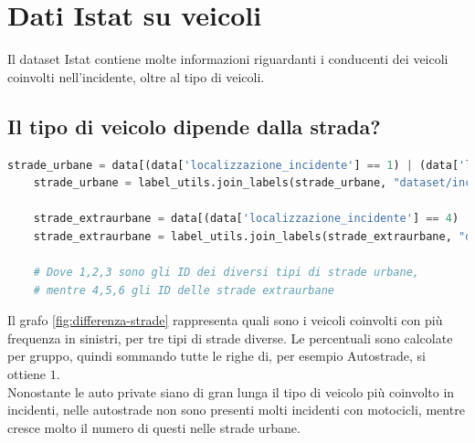 \documentclass[a4paper]{report}
\begin{document}
\section{Dati Istat su veicoli}

Il dataset Istat contiene molte informazioni riguardanti i conducenti dei veicoli coinvolti 
nell'incidente, oltre al tipo di veicoli.

\subsection{Il tipo di veicolo dipende dalla strada?}


\begin{lstlisting}[language=Python]
    strade_urbane = data[(data['localizzazione_incidente'] == 1) | (data['localizzazione_incidente'] == 2) | (data['localizzazione_incidente'] == 3)]['tipo_veicolo_a']
    strade_urbane = label_utils.join_labels(strade_urbane, "dataset/incidenti/Classificazioni/tipo_veicoli__b_.csv").value_counts(normalize=True).sort_index()

    strade_extraurbane = data[(data['localizzazione_incidente'] == 4) | (data['localizzazione_incidente'] == 5) | (data['localizzazione_incidente'] == 6)]['tipo_veicolo_a']
    strade_extraurbane = label_utils.join_labels(strade_extraurbane, "dataset/incidenti/Classificazioni/tipo_veicoli__b_.csv").value_counts(normalize=True).sort_index()

    # Dove 1,2,3 sono gli ID dei diversi tipi di strade urbane, 
    # mentre 4,5,6 gli ID delle strade extraurbane
\end{lstlisting}

Il grafo \ref{fig:differenza-strade} rappresenta quali sono i veicoli coinvolti con più frequenza 
in sinistri, per tre tipi di strade diverse. Le percentuali sono calcolate per gruppo, quindi sommando 
tutte le righe di, per esempio Autostrade, si ottiene $1$.\\
Nonostante le auto private siano di gran lunga il tipo di veicolo 
più coinvolto in incidenti, nelle autostrade non sono presenti molti incidenti con motocicli, 
mentre cresce molto il numero di questi nelle strade urbane.
\end{document}
